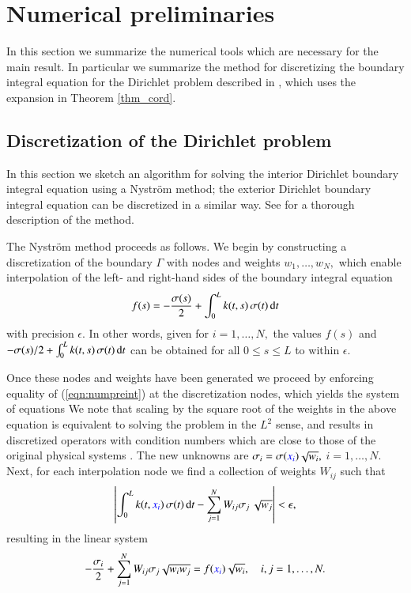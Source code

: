 
\section{Numerical preliminaries \label{sec:nprelim}}
In this section we summarize the numerical tools which are necessary for the main result. In particular we summarize the method for discretizing the boundary integral equation for the Dirichlet problem described in \cite{hoskins2019numerical}, which uses the expansion in Theorem \ref{thm_cord}.
\subsection{Discretization of the Dirichlet problem}\label{sec:disc_dir}
In this section we sketch an algorithm for solving the interior Dirichlet boundary integral equation using a Nystr\"{o}m method; the exterior Dirichlet boundary integral equation can be discretized in a similar way. See \cite{hoskins2019numerical} for a thorough description of the method. 

The Nystr\"{o}m method proceeds as follows. We begin by constructing a discretization of the boundary $\Gamma$ with nodes  and weights $w_1,\dots,w_N,$ which enable interpolation of the left- and right-hand sides of the boundary integral equation
\begin{align}\label{eqn:numpreint}
f(s) = -\frac{\sigma(s)}{2} + \int_0^L k(t,s) \,\sigma(t)\, {\rm d} t
\end{align}
with precision $\epsilon.$ In other words, given  for $i=1,\dots,N,$ the values $f(s)$ and $-\sigma(s)/2 + \int_0^L k(t,s) \,\sigma(t)\, {\rm d} t$ can be obtained for all $0 \le s \le L$ to within $\epsilon.$

Once these nodes and weights have been generated we proceed by enforcing equality of (\ref{eqn:numpreint}) at the discretization nodes, which yields the system of equations
We note that scaling by the square root of the weights in the above equation is equivalent to solving the problem in the $L^2$ sense, and results in discretized operators with condition numbers which are close to those of the original physical systems \cite{bremer3}. The new unknowns are $\sigma_i = \sigma({\color{blue} x_i}) \sqrt{w_i},$ $i=1,\dots,N.$ Next, for each interpolation node  we find a collection of weights $W_{ij}$ such that
\begin{align}
\left|\int_0^L k(t,{\color{blue} x_i})\, \sigma(t)\,{\rm d}t- \sum_{j=1}^N W_{ij} \sigma_j\, \sqrt{w_j} \right| < \epsilon,
\end{align}
resulting in the linear system
\begin{align}
  -\frac{\sigma_i}{2} +  \sum_{j=1}^N W_{ij} \sigma_j \sqrt{w_i w_j}=f({\color{blue} x_i}) \sqrt{w_i},\quad i,j=1,\dots,N. 
\end{align}

